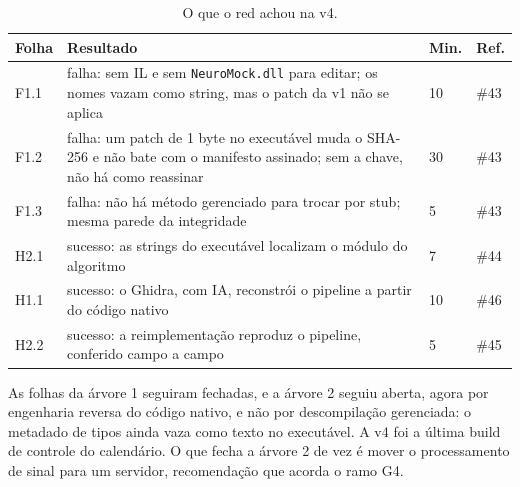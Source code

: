 \begin{table}[htbp]
\centering
\caption{O que o red achou na v4.}
\label{qd:v4}
\small
\begin{tabular}{L{1.2cm}L{10.2cm}L{1.2cm}L{1.2cm}}
\toprule
Folha & Resultado & Min. & Ref. \\
\midrule
F1.1 & falha: sem IL e sem \texttt{NeuroMock.dll} para editar; os nomes vazam como string, mas o patch da v1 não se aplica & 10 & \#43 \\
F1.2 & falha: um patch de 1 byte no executável muda o SHA-256 e não bate com o manifesto assinado; sem a chave, não há como reassinar & 30 & \#43 \\
F1.3 & falha: não há método gerenciado para trocar por stub; mesma parede da integridade & 5 & \#43 \\
H2.1 & sucesso: as strings do executável localizam o módulo do algoritmo & 7 & \#44 \\
H1.1 & sucesso: o Ghidra, com IA, reconstrói o pipeline a partir do código nativo & 10 & \#46 \\
H2.2 & sucesso: a reimplementação reproduz o pipeline, conferido campo a campo & 5 & \#45 \\
\bottomrule
\end{tabular}
\end{table}

As folhas da árvore 1 seguiram fechadas, e a árvore 2 seguiu aberta, agora por engenharia reversa do código nativo, e não por descompilação gerenciada: o metadado de tipos ainda vaza como texto no executável. A v4 foi a última build de controle do calendário. O que fecha a árvore 2 de vez é mover o processamento de sinal para um servidor, recomendação que acorda o ramo G4.
